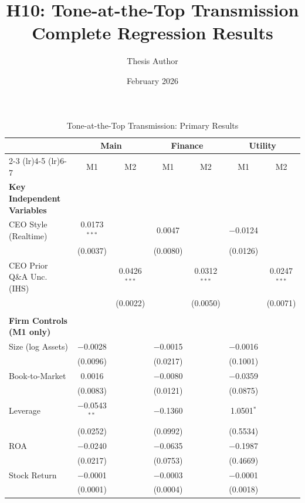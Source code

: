 \documentclass[11pt]{article}
\begin{document}
\title{H10: Tone-at-the-Top Transmission\\Complete Regression Results}
\author{Thesis Author}
\date{February 2026}
\maketitle

\begin{table}[htbp]
\centering
\caption{Tone-at-the-Top Transmission: Primary Results}
\label{tab:primary_results}
\footnotesize
\setlength{\tabcolsep}{4pt}
\begin{tabular}{lcccccc}
\toprule
 & \multicolumn{2}{c}{Main} & \multicolumn{2}{c}{Finance} & \multicolumn{2}{c}{Utility} \\
\cmidrule(lr){2-3} \cmidrule(lr){4-5} \cmidrule(lr){6-7}
 & M1 & M2 & M1 & M2 & M1 & M2 \\
\midrule
\textbf{Key Independent Variables} \\
CEO Style (Realtime) & 0.0173$^{***}$ &  & 0.0047 &  & $-$0.0124 &  \\
 & (0.0037) &  & (0.0080) &  & (0.0126) &  \\
CEO Prior Q\&A Unc. (IHS) &  & 0.0426$^{***}$ &  & 0.0312$^{***}$ &  & 0.0247$^{***}$ \\
 &  & (0.0022) &  & (0.0050) &  & (0.0071) \\
 &  &  &  &  &  & \\
\textbf{Firm Controls (M1 only)} \\
Size (log Assets) & $-$0.0028 &  & $-$0.0015 &  & $-$0.0016 &  \\
 & (0.0096) &  & (0.0217) &  & (0.1001) &  \\
Book-to-Market & 0.0016 &  & $-$0.0080 &  & $-$0.0359 &  \\
 & (0.0083) &  & (0.0121) &  & (0.0875) &  \\
Leverage & $-$0.0543$^{**}$ &  & $-$0.1360 &  & 1.0501$^{*}$ &  \\
 & (0.0252) &  & (0.0992) &  & (0.5534) &  \\
ROA & $-$0.0240 &  & $-$0.0635 &  & $-$0.1987 &  \\
 & (0.0217) &  & (0.0753) &  & (0.4669) &  \\
Stock Return & $-$0.0001 &  & $-$0.0003 &  & $-$0.0001 &  \\
 & (0.0001) &  & (0.0004) &  & (0.0018) &  \\

\end{tabular}
\end{table}
\end{document}

